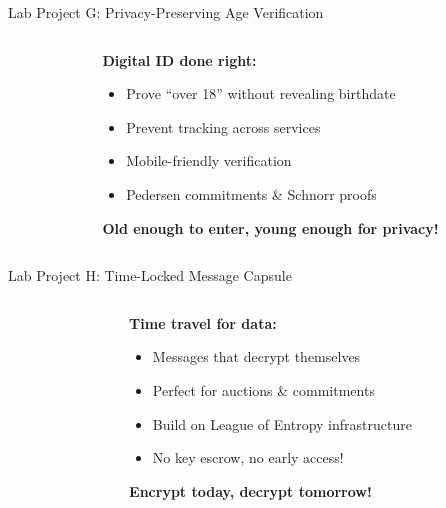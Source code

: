 \documentclass[aspectratio=169, lualatex, handout]{beamer}
\begin{document}
\begin{frame}{Lab Project G: Privacy-Preserving Age Verification}
	\begin{columns}[c]
		\begin{column}{0.5\textwidth}
		\end{column}
		\begin{column}{0.5\textwidth}
			\textbf{Digital ID done right:}
			\begin{itemize}[<+->]
				\item Prove ``over 18'' without revealing birthdate
				\item Prevent tracking across services
				\item Mobile-friendly verification
				\item Pedersen commitments \& Schnorr proofs
			\end{itemize}
			\vspace{0.5cm}
			\textcolor{cipherprimary}{\textbf{Old enough to enter, young enough for privacy!}}
		\end{column}
	\end{columns}
\end{frame}

\begin{frame}{Lab Project H: Time-Locked Message Capsule}
	\begin{columns}[c]
		\begin{column}{0.5\textwidth}
		\end{column}
		\begin{column}{0.5\textwidth}
			\textbf{Time travel for data:}
			\begin{itemize}[<+->]
				\item Messages that decrypt themselves
				\item Perfect for auctions \& commitments
				\item Build on League of Entropy infrastructure
				\item No key escrow, no early access!
			\end{itemize}
			\vspace{0.5cm}
			\textcolor{cipherprimary}{\textbf{Encrypt today, decrypt tomorrow!}}
		\end{column}
	\end{columns}
\end{frame}
\end{document}
